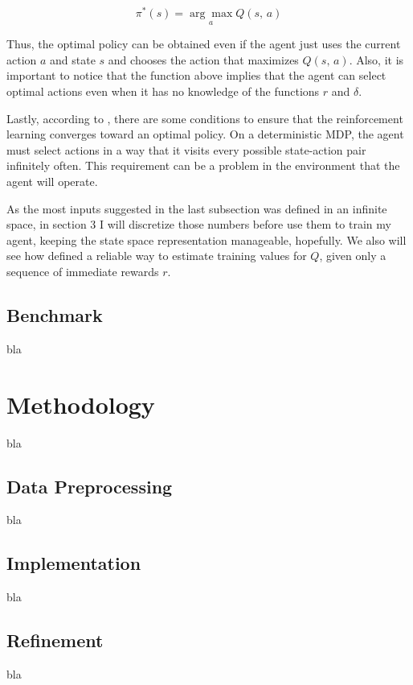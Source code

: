 \documentclass[a4paper]{article}
\begin{document}
$$\pi^{*}(s) = \underset{a}{\arg \max} Q(s, \, a)$$

Thus, the optimal policy can be obtained even if the agent just uses the current action $a$ and state $s$ and chooses the action that maximizes $Q(s,\, a)$. Also, it is important to notice that the function above implies that the agent can select optimal actions even when it has no knowledge of the functions $r$ and $\delta$.

Lastly, according to \cite{Mitchell}, there are some conditions to ensure that the reinforcement learning converges toward an optimal policy. On a deterministic MDP, the agent must select actions in a way that it visits every possible state-action pair infinitely often. This requirement can be a problem in the environment that the agent will operate.

As the most inputs suggested in the last subsection was defined in an infinite space, in section 3 I will discretize those numbers before use them to train my agent, keeping the state space representation manageable, hopefully. We also will see how \cite{Mitchell} defined a reliable way to estimate training values for $Q$, given only a sequence of immediate rewards $r$.

\subsection{Benchmark}
bla


\section{Methodology}
\label{sec:methodology}

bla

\subsection{Data Preprocessing}
bla

\subsection{Implementation}
bla

\subsection{Refinement}
bla
\end{document}

